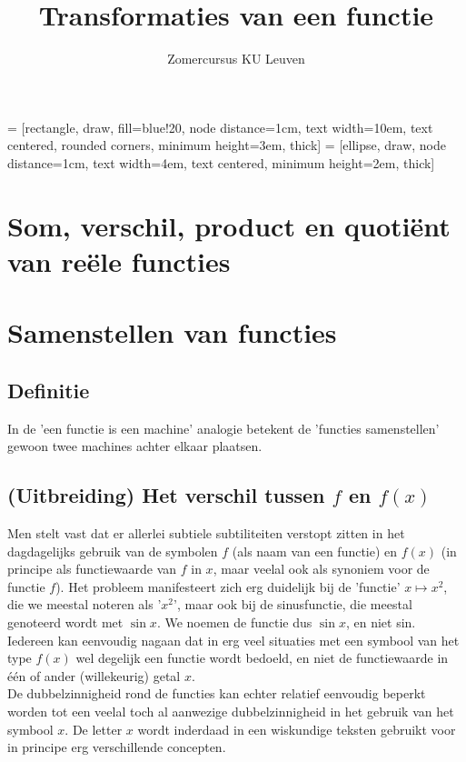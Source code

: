 \documentclass{ximera}
\author{Zomercursus KU Leuven}
\title{Transformaties van een functie}
\begin{document}
\begin{abstract}

\end{abstract}
\maketitle  

 = [rectangle, draw, fill=blue!20, node distance=1cm, text width=10em, text centered, rounded corners, minimum height=3em, thick]
 = [ellipse, draw, node distance=1cm, text width=4em, text centered, minimum height=2em, thick]

\section{Som, verschil, product en quotiënt van reële functies}


\section{Samenstellen van functies}

\subsection{Definitie}
In de 'een functie is een machine' analogie betekent de 'functies samenstellen' gewoon twee machines achter elkaar plaatsen. 


\subsection{(Uitbreiding) Het verschil tussen $f$ en $f(x)$}

Men stelt vast dat er allerlei subtiele subtiliteiten verstopt zitten in het dagdagelijks gebruik van de symbolen $f$ (als naam van een functie) en $f(x)$ (in principe als functiewaarde van $f$ in $x$, maar veelal ook als synoniem voor de functie $f$). Het probleem manifesteert zich erg duidelijk bij de 'functie' $x\mapsto x^2$, die we meestal noteren als '$x^2$', maar ook bij de sinusfunctie, die meestal genoteerd wordt met $\sin x$. We noemen de functie dus $\sin x$, en niet sin. Iedereen kan eenvoudig nagaan dat in erg veel situaties met een symbool van het type $f(x)$ wel degelijk een functie wordt bedoeld, en niet de functiewaarde in één of ander (willekeurig) getal $x$.
\\

De dubbelzinnigheid rond de functies kan echter relatief eenvoudig beperkt worden tot een veelal toch al aanwezige dubbelzinnigheid in het gebruik van het symbool $x$. De letter $x$ wordt inderdaad in een wiskundige teksten gebruikt voor in principe erg verschillende concepten. 
\\
\end{document}
